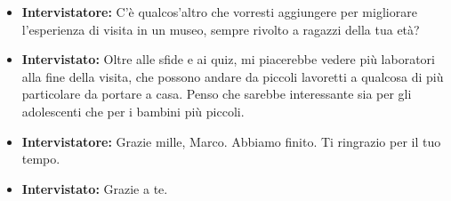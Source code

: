 \documentclass{article}
\begin{document}
\begin{itemize}
    \item \textbf{Intervistatore:} C’è qualcos’altro che vorresti aggiungere per migliorare l’esperienza di visita in un museo, sempre rivolto a ragazzi della tua età?

    \item \textbf{Intervistato:} Oltre alle sfide e ai quiz, mi piacerebbe vedere più laboratori alla fine della visita, che possono andare da piccoli lavoretti a qualcosa di più particolare da portare a casa. Penso che sarebbe interessante sia per gli adolescenti che per i bambini più piccoli.

    \item \textbf{Intervistatore:} Grazie mille, Marco. Abbiamo finito. Ti ringrazio per il tuo tempo.

    \item \textbf{Intervistato:} Grazie a te.

\end{itemize}
\end{document}
